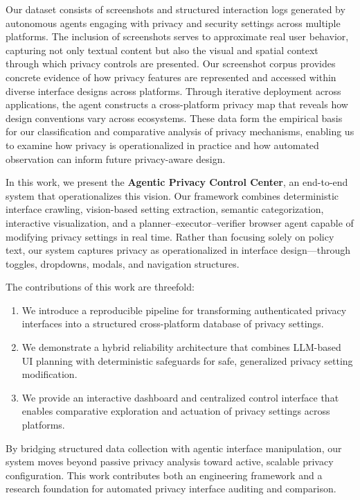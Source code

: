 \documentclass[12pt,letterpaper]{article}
\begin{document}
    Our dataset consists of screenshots and structured interaction logs generated by autonomous agents engaging with privacy and security settings across multiple platforms. The inclusion of screenshots serves to approximate real user behavior, capturing not only textual content but also the visual and spatial context through which privacy controls are presented. Our screenshot corpus provides concrete evidence of how privacy features are represented and accessed within diverse interface designs across platforms. Through iterative deployment across applications, the agent constructs a cross-platform privacy map that reveals how design conventions vary across ecosystems. These data form the empirical basis for our classification and comparative analysis of privacy mechanisms, enabling us to examine how privacy is operationalized in practice and how automated observation can inform future privacy-aware design. 

     In this work, we present the \textbf{Agentic Privacy Control Center}, an end-to-end system that operationalizes this vision. Our framework combines deterministic interface crawling, vision-based setting extraction, semantic categorization, interactive visualization, and a planner–executor–verifier browser agent capable of modifying privacy settings in real time. Rather than focusing solely on policy text, our system captures privacy as operationalized in interface design—through toggles, dropdowns, modals, and navigation structures.

    The contributions of this work are threefold:
    
    \begin{enumerate}
        \item We introduce a reproducible pipeline for transforming authenticated privacy interfaces into a structured cross-platform database of privacy settings.
        \item We demonstrate a hybrid reliability architecture that combines LLM-based UI planning with deterministic safeguards for safe, generalized privacy setting modification.
        \item We provide an interactive dashboard and centralized control interface that enables comparative exploration and actuation of privacy settings across platforms.
    \end{enumerate}
    
    By bridging structured data collection with agentic interface manipulation, our system moves beyond passive privacy analysis toward active, scalable privacy configuration. This work contributes both an engineering framework and a research foundation for automated privacy interface auditing and comparison.
\end{document}
